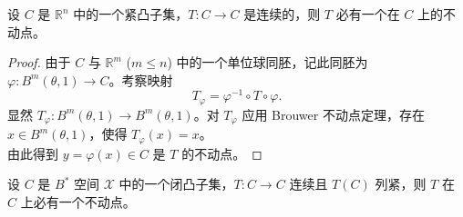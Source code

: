 \documentclass[lang=cn,newtx,10pt,scheme=chinese,thmcnt=chapter]{elegantbook}
\begin{document}
\begin{corollary}
设 $C$ 是 $\mathbb{R}^n$ 中的一个紧凸子集，$T: C \rightarrow C$ 是连续的，则 $T$ 必有一个在 $C$ 上的不动点。
\end{corollary}

\begin{proof}
由于 $C$ 与 $\mathbb{R}^m$ ($m \leqslant n$) 中的一个单位球同胚，记此同胚为 $\varphi: B^m(\theta, 1) \rightarrow C$。考察映射
\[
T_{\varphi} = \varphi^{-1} \circ T \circ \varphi.
\]
显然 $T_{\varphi}: B^m(\theta, 1) \rightarrow B^m(\theta, 1)$。对 $T_{\varphi}$ 应用 Brouwer 不动点定理，存在 $x \in B^m(\theta, 1)$，使得 $T_{\varphi}(x) = x$。\\
由此得到 $y = \varphi(x) \in C$ 是 $T$ 的不动点。
\end{proof}
\begin{theorem}[Schauder]
设 \(C\) 是 \(B^*\) 空间 \(\mathscr{X}\) 中的一个闭凸子集，\(T: C \rightarrow C\) 连续且 \(T(C)\) 列紧，则 \(T\) 在 \(C\) 上必有一个不动点。
\end{theorem}
\end{document}
